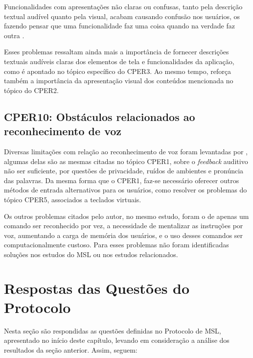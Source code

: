 Funcionalidades com apresentações não claras ou confusas, tanto pela descrição textual audível quanto pela visual, acabam
causando confusão nos usuários, os fazendo pensar que uma funcionalidade faz uma coisa quando na verdade faz outra \cite{Christoph2020}.

Esses problemas ressaltam ainda mais a importância de fornecer descrições textuais audíveis claras dos elementos de tela
e funcionalidades da aplicação, como é apontado no tópico específico do CPER3. Ao mesmo tempo, reforça também a importância
da apresentação visual dos conteúdos mencionada no tópico do CPER2.

\subsection{CPER10: Obstáculos relacionados ao reconhecimento de voz}

Diversas limitações com relação ao reconhecimento de voz foram levantadas por , algumas delas
são as mesmas citadas no tópico CPER1, sobre o \emph{feedback} auditivo não ser suficiente, por questões de privacidade,
ruídos de ambientes e pronúncia das palavras. Da mesma forma que o CPER1, faz-se necessário oferecer outros métodos
de entrada alternativos para os usuários, como resolver os problemas do tópico CPER5, associados a teclados virtuais.

Os outros problemas citados pelo autor, no mesmo estudo, foram o de apenas um comando ser reconhecido por vez, a necessidade
de mentalizar as instruções por voz, aumentando a carga de memória dos usuários, e o uso desses comandos ser computacionalmente
custoso. Para esses problemas não foram identificadas soluções nos estudos do MSL ou nos estudos relacionados.

\section{Respostas das Questões do Protocolo}

Nesta seção são respondidas as questões definidas no Protocolo de MSL, apresentado no início deste capítulo, levando em consideração a análise dos resultados da seção anterior.
Assim, seguem:


